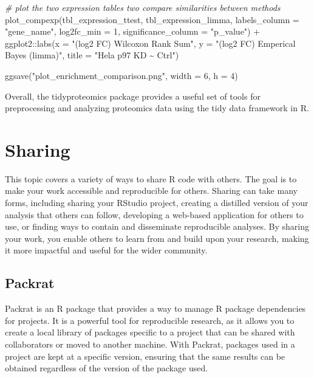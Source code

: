 \documentclass[
]{book}
\newenvironment{Shaded}{\begin{snugshade}}{\end{snugshade}}
\newcommand{\AttributeTok}[1]{\textcolor[rgb]{0.77,0.63,0.00}{#1}}
\newcommand{\CommentTok}[1]{\textcolor[rgb]{0.56,0.35,0.01}{\textit{#1}}}
\newcommand{\DecValTok}[1]{\textcolor[rgb]{0.00,0.00,0.81}{#1}}
\newcommand{\FunctionTok}[1]{\textcolor[rgb]{0.00,0.00,0.00}{#1}}
\newcommand{\NormalTok}[1]{#1}
\newcommand{\SpecialCharTok}[1]{\textcolor[rgb]{0.00,0.00,0.00}{#1}}
\newcommand{\StringTok}[1]{\textcolor[rgb]{0.31,0.60,0.02}{#1}}
\begin{document}
\begin{Shaded}
\begin{Highlighting}[]
\CommentTok{\# plot the two expression tables two compare similarities between methods}
\FunctionTok{plot\_compexp}\NormalTok{(tbl\_expression\_ttest,}
\NormalTok{             tbl\_expression\_limma,}
             \AttributeTok{labels\_column =} \StringTok{"gene\_name"}\NormalTok{,}
             \AttributeTok{log2fc\_min =} \DecValTok{1}\NormalTok{, }\AttributeTok{significance\_column =} \StringTok{"p\_value"}\NormalTok{) }\SpecialCharTok{+}
\NormalTok{  ggplot2}\SpecialCharTok{::}\FunctionTok{labs}\NormalTok{(}\AttributeTok{x =} \StringTok{"(log2 FC) Wilcoxon Rank Sum"}\NormalTok{,}
                \AttributeTok{y =} \StringTok{"(log2 FC) Emperical Bayes (limma)"}\NormalTok{,}
                \AttributeTok{title =} \StringTok{"Hela p97 KD \textasciitilde{} Ctrl"}\NormalTok{)}

\FunctionTok{ggsave}\NormalTok{(}\StringTok{"plot\_enrichment\_comparison.png"}\NormalTok{,}
       \AttributeTok{width =} \DecValTok{6}\NormalTok{, }\AttributeTok{h =} \DecValTok{4}\NormalTok{)}
\end{Highlighting}
\end{Shaded}

Overall, the tidyproteomics package provides a useful set of tools for preprocessing and analyzing proteomics data using the tidy data framework in R.

\hypertarget{sharing}{%
\chapter{Sharing}\label{sharing}}

This topic covers a variety of ways to share R code with others. The goal is to make your work accessible and reproducible for others. Sharing can take many forms, including sharing your RStudio project, creating a distilled version of your analysis that others can follow, developing a web-based application for others to use, or finding ways to contain and disseminate reproducible analyses. By sharing your work, you enable others to learn from and build upon your research, making it more impactful and useful for the wider community.

\hypertarget{packrat}{%
\section{Packrat}\label{packrat}}

Packrat is an R package that provides a way to manage R package dependencies for projects. It is a powerful tool for reproducible research, as it allows you to create a local library of packages specific to a project that can be shared with collaborators or moved to another machine. With Packrat, packages used in a project are kept at a specific version, ensuring that the same results can be obtained regardless of the version of the package used.
\end{document}
